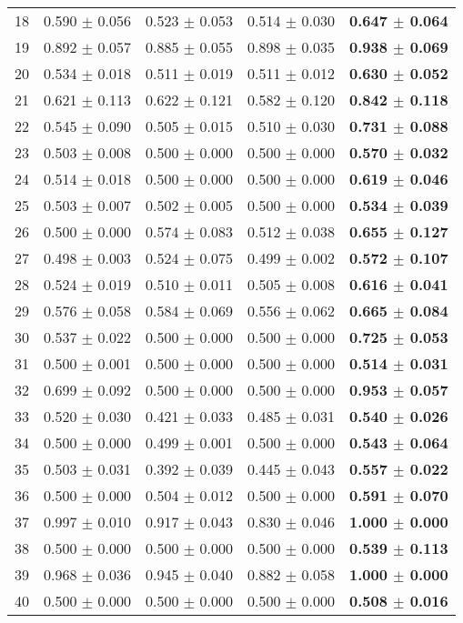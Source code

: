 \begin{table}[!ht]
{\begin{tabular}{r c c c c}
18 & 0.590 $\pm$ 0.056 & 0.523 $\pm$ 0.053 & 0.514 $\pm$ 0.030 & \textbf{0.647 $\pm$ 0.064} \\
19 & 0.892 $\pm$ 0.057 & 0.885 $\pm$ 0.055 & 0.898 $\pm$ 0.035 & \textbf{0.938 $\pm$ 0.069} \\
20 & 0.534 $\pm$ 0.018 & 0.511 $\pm$ 0.019 & 0.511 $\pm$ 0.012 & \textbf{0.630 $\pm$ 0.052} \\
21 & 0.621 $\pm$ 0.113 & 0.622 $\pm$ 0.121 & 0.582 $\pm$ 0.120 & \textbf{0.842 $\pm$ 0.118} \\
22 & 0.545 $\pm$ 0.090 & 0.505 $\pm$ 0.015 & 0.510 $\pm$ 0.030 & \textbf{0.731 $\pm$ 0.088} \\
23 & 0.503 $\pm$ 0.008 & 0.500 $\pm$ 0.000 & 0.500 $\pm$ 0.000 & \textbf{0.570 $\pm$ 0.032} \\
24 & 0.514 $\pm$ 0.018 & 0.500 $\pm$ 0.000 & 0.500 $\pm$ 0.000 & \textbf{0.619 $\pm$ 0.046} \\
25 & 0.503 $\pm$ 0.007 & 0.502 $\pm$ 0.005 & 0.500 $\pm$ 0.000 & \textbf{0.534 $\pm$ 0.039} \\
26 & 0.500 $\pm$ 0.000 & 0.574 $\pm$ 0.083 & 0.512 $\pm$ 0.038 & \textbf{0.655 $\pm$ 0.127} \\
27 & 0.498 $\pm$ 0.003 & 0.524 $\pm$ 0.075 & 0.499 $\pm$ 0.002 & \textbf{0.572 $\pm$ 0.107} \\
28 & 0.524 $\pm$ 0.019 & 0.510 $\pm$ 0.011 & 0.505 $\pm$ 0.008 & \textbf{0.616 $\pm$ 0.041} \\
29 & 0.576 $\pm$ 0.058 & 0.584 $\pm$ 0.069 & 0.556 $\pm$ 0.062 & \textbf{0.665 $\pm$ 0.084} \\
30 & 0.537 $\pm$ 0.022 & 0.500 $\pm$ 0.000 & 0.500 $\pm$ 0.000 & \textbf{0.725 $\pm$ 0.053} \\
31 & 0.500 $\pm$ 0.001 & 0.500 $\pm$ 0.000 & 0.500 $\pm$ 0.000 & \textbf{0.514 $\pm$ 0.031} \\
32 & 0.699 $\pm$ 0.092 & 0.500 $\pm$ 0.000 & 0.500 $\pm$ 0.000 & \textbf{0.953 $\pm$ 0.057} \\
33 & 0.520 $\pm$ 0.030 & 0.421 $\pm$ 0.033 & 0.485 $\pm$ 0.031 & \textbf{0.540 $\pm$ 0.026} \\
34 & 0.500 $\pm$ 0.000 & 0.499 $\pm$ 0.001 & 0.500 $\pm$ 0.000 & \textbf{0.543 $\pm$ 0.064} \\
35 & 0.503 $\pm$ 0.031 & 0.392 $\pm$ 0.039 & 0.445 $\pm$ 0.043 & \textbf{0.557 $\pm$ 0.022} \\
36 & 0.500 $\pm$ 0.000 & 0.504 $\pm$ 0.012 & 0.500 $\pm$ 0.000 & \textbf{0.591 $\pm$ 0.070} \\
37 & 0.997 $\pm$ 0.010 & 0.917 $\pm$ 0.043 & 0.830 $\pm$ 0.046 & \textbf{1.000 $\pm$ 0.000} \\
38 & 0.500 $\pm$ 0.000 & 0.500 $\pm$ 0.000 & 0.500 $\pm$ 0.000 & \textbf{0.539 $\pm$ 0.113} \\
39 & 0.968 $\pm$ 0.036 & 0.945 $\pm$ 0.040 & 0.882 $\pm$ 0.058 & \textbf{1.000 $\pm$ 0.000} \\
40 & 0.500 $\pm$ 0.000 & 0.500 $\pm$ 0.000 & 0.500 $\pm$ 0.000 & \textbf{0.508 $\pm$ 0.016} \\
\end{tabular}}
\end{table}
